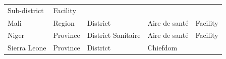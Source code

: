 \documentclass[]{book}
\begin{document}
\begin{longtable}[]{@{}lllll@{}}
\begin{minipage}[t]{0.20\columnwidth}
Sub-district\strut
\end{minipage} & \begin{minipage}[t]{0.20\columnwidth}\raggedright
Facility\strut
\end{minipage}\tabularnewline
\begin{minipage}[t]{0.07\columnwidth}\raggedright
Mali\strut
\end{minipage} & \begin{minipage}[t]{0.20\columnwidth}\raggedright
Region\strut
\end{minipage} & \begin{minipage}[t]{0.20\columnwidth}\raggedright
District\strut
\end{minipage} & \begin{minipage}[t]{0.20\columnwidth}\raggedright
Aire de santé\strut
\end{minipage} & \begin{minipage}[t]{0.20\columnwidth}\raggedright
Facility\strut
\end{minipage}\tabularnewline
\begin{minipage}[t]{0.07\columnwidth}\raggedright
Niger\strut
\end{minipage} & \begin{minipage}[t]{0.20\columnwidth}\raggedright
Province\strut
\end{minipage} & \begin{minipage}[t]{0.20\columnwidth}\raggedright
District Sanitaire\strut
\end{minipage} & \begin{minipage}[t]{0.20\columnwidth}\raggedright
Aire de santé\strut
\end{minipage} & \begin{minipage}[t]{0.20\columnwidth}\raggedright
Facility\strut
\end{minipage}\tabularnewline
\begin{minipage}[t]{0.07\columnwidth}\raggedright
Sierra Leone\strut
\end{minipage} & \begin{minipage}[t]{0.20\columnwidth}\raggedright
Province\strut
\end{minipage} & \begin{minipage}[t]{0.20\columnwidth}\raggedright
District\strut
\end{minipage} & \begin{minipage}[t]{0.20\columnwidth}\raggedright
Chiefdom\strut
\end{minipage} & \begin{minipage}[t]{0.20\columnwidth}\raggedright

\end{minipage}
\end{longtable}
\end{document}
